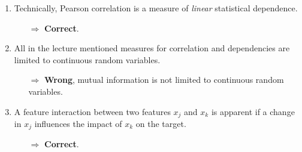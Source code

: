 \begin{enumerate}
        \item Technically, Pearson correlation is a measure of \textit{linear} statistical dependence. 
        \begin{itemize}
        	\item[$\Rightarrow$] \textbf{Correct}.
        \end{itemize}
    	\item All in the lecture mentioned measures for correlation and dependencies are limited to continuous random variables.
    	\begin{itemize}
    		\item[$\Rightarrow$] \textbf{Wrong}, mutual information is not limited to continuous random variables.
    	\end{itemize}
    	\item A feature interaction between two features $x_j$ and $x_k$ is apparent if a change in $x_j$ influences the impact of $x_k$ on the target.
    	\begin{itemize}
    		\item[$\Rightarrow$] \textbf{Correct}.
    	\end{itemize}
	\end{enumerate}